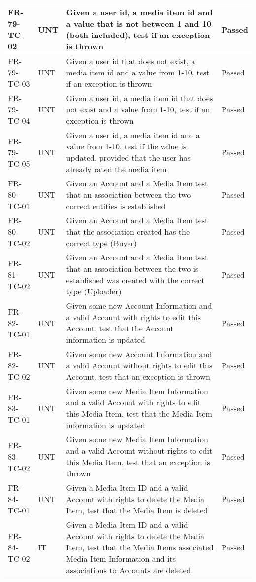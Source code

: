 \documentclass[../report.tex]{subfiles}
\begin{document}
\begin{longtable}{|L{2.1cm}|L{1cm}|L{12.4cm}|L{1.4cm}|}
FR-79-TC-02&UNT&Given a user id, a media item id and a value that is not between 1 and 10 (both included), test if an exception is thrown&Passed  \\ \hline
FR-79-TC-03&UNT&Given a user id that does not exist, a media item id and a value from 1-10, test if an exception is thrown&Passed  \\ \hline
FR-79-TC-04&UNT&Given a user id, a media item id that does not exist and a value from 1-10, test if an exception is thrown&Passed  \\ \hline
FR-79-TC-05&UNT&Given a user id, a media item id and a value from 1-10, test if the value is updated, provided that the user has already rated the media item&Passed  \\ \hline
FR-80-TC-01&UNT&Given an Account and a Media Item test that an association between the two correct entities is established &Passed  \\ \hline
FR-80-TC-02&UNT&Given an Account and a Media Item test that the association created has the correct type (Buyer)&Passed  \\ \hline
FR-81-TC-02&UNT&Given an Account and a Media Item test that an association between the two is established was created with the correct type (Uploader)&Passed  \\ \hline
FR-82-TC-01&UNT&Given some new Account Information and a valid Account with rights to edit this Account, test that the Account information is updated&Passed  \\ \hline
FR-82-TC-02&UNT&Given some new Account Information and a valid Account without rights to edit this Account, test that an exception is thrown&Passed  \\ \hline
FR-83-TC-01&UNT&Given some new Media Item Information and a valid Account with rights to edit this Media Item, test that the Media Item information is updated&Passed  \\ \hline
FR-83-TC-02&UNT&Given some new Media Item Information and a valid Account without rights to edit this Media Item, test that an exception is thrown&Passed  \\ \hline
FR-84-TC-01&UNT&Given a Media Item ID and a valid Account with rights to delete the Media Item, test that the Media Item is deleted&Passed  \\ \hline
FR-84-TC-02&IT&Given a Media Item ID and a valid Account with rights to delete the Media Item, test that the Media Items associated Media Item Information and its associations to Accounts are deleted&Passed  \\ \hline

\end{longtable}
\end{document}
